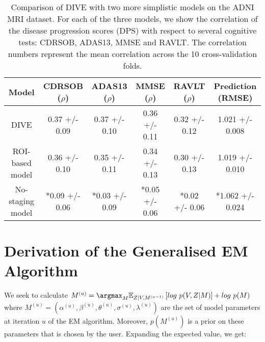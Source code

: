 \begin{table}[H]
\centering
\begin{footnotesize}
 \begin{tabular}{c | c c c c | c}
  Model & CDRSOB ($\rho$) & ADAS13 ($\rho$) & MMSE ($\rho$) & RAVLT ($\rho$) & Prediction (RMSE)\\
  \hline 
DIVE & 0.37 +/- 0.09 & 0.37 +/- 0.10 & 0.36 +/- 0.11 & 0.32 +/- 0.12 & 1.021 +/- 0.008 \\
ROI-based model & 0.36 +/- 0.10 & 0.35 +/- 0.11 & 0.34 +/- 0.13 & 0.30 +/- 0.13 & 1.019 +/- 0.010 \\
No-staging model & *0.09 +/- 0.06 & *0.03 +/- 0.09 & *0.05 +/- 0.06 & *0.02 +/- 0.06 & *1.062 +/- 0.024 \\

 \end{tabular}
 \end{footnotesize}
 \caption[Comparison of DIVE with two more simplistic models on the ADNI MRI dataset.]{Comparison of DIVE with two more simplistic models on the ADNI MRI dataset. For each of the three models, we show the correlation of the disease progression scores (DPS) with respect to several cognitive tests: CDRSOB, ADAS13, MMSE and RAVLT. The correlation numbers represent the mean correlation across the 10 cross-validation folds. }
 \label{tab1}
\end{table}



\section{Derivation of the Generalised EM Algorithm}
\label{sec:diveEmDerivAppendix}

We seek to calculate $M^{(u)} = \argmax_{M} \mathbb{E}_{Z|V,M^{(u-1)}} \left[log\ p(V,Z|M)\right] + log\ p(M)$  where $M^{(u)} = (\alpha^{(u)}, \beta^{(u)}, \theta^{(u)}, \sigma^{(u)}, \lambda^{(u)})$ are the set of model parameters at iteration $u$ of the EM algorithm. Moreover, $p(M^{(u)})$ is a prior on these parameters that is chosen by the user. Expanding the expected value, we get:

